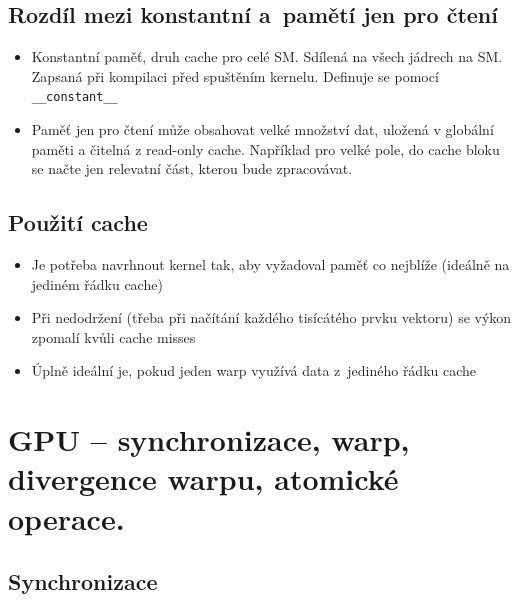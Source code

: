 \subsection{Rozdíl mezi konstantní a~pamětí jen pro čtení}
\begin{itemize}
    \item Konstantní paměť, druh cache pro celé SM. Sdílená na všech jádrech na SM. Zapsaná při kompilaci před spuštěním kernelu. Definuje se pomocí \texttt{\_\_constant\_\_} 
    \item Paměť jen pro čtení může obsahovat velké množství dat, uložená v globální paměti a čitelná z read-only cache. Například pro velké pole, do cache bloku se načte jen relevatní část, kterou bude zpracovávat.
\end{itemize}

\subsection{Použití cache}
\begin{itemize}
    \item Je potřeba navrhnout kernel tak, aby vyžadoval paměť co nejblíže (ideálně na jediném řádku cache)
    \item Při nedodržení (třeba při načítání každého tisícátého prvku vektoru) se výkon zpomalí kvůli cache misses
    \item Úplně ideální je, pokud jeden warp využívá data z~jediného řádku cache
\end{itemize}

\section{GPU – synchronizace, warp, divergence warpu, atomické operace.}
\subsection{Synchronizace}
